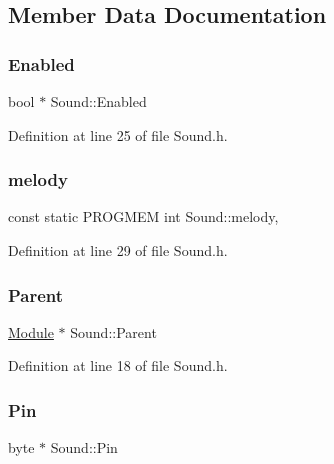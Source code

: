 \subsection{Member Data Documentation}
\mbox{\label{class_sound_afd4cd9f0db67980b0af5c8c6ed1c3b76}} 
\subsubsection{\texorpdfstring{Enabled}{Enabled}}
{\footnotesize\ttfamily bool $\ast$ Sound\+::\+Enabled\hspace{0.3cm}{\ttfamily [protected]}}



Definition at line 25 of file Sound.\+h.

\mbox{\label{class_sound_a7553aed616a29ed18c2e9f5b4a5f2260}} 
\subsubsection{\texorpdfstring{melody}{melody}}
{\footnotesize\ttfamily const static P\+R\+O\+G\+M\+EM int Sound\+::melody\hspace{0.3cm}{\ttfamily [static]}, {\ttfamily [protected]}}



Definition at line 29 of file Sound.\+h.

\mbox{\label{class_sound_a34e48159f12d4431e962d80fad71eb02}} 
\subsubsection{\texorpdfstring{Parent}{Parent}}
{\footnotesize\ttfamily \hyperlink{class_module}{Module} $\ast$ Sound\+::\+Parent\hspace{0.3cm}{\ttfamily [protected]}}



Definition at line 18 of file Sound.\+h.

\mbox{\label{class_sound_a2a57d6464d4edef8b652d3b9602de07e}} 
\subsubsection{\texorpdfstring{Pin}{Pin}}
{\footnotesize\ttfamily byte $\ast$ Sound\+::\+Pin\hspace{0.3cm}{\ttfamily [protected]}}



